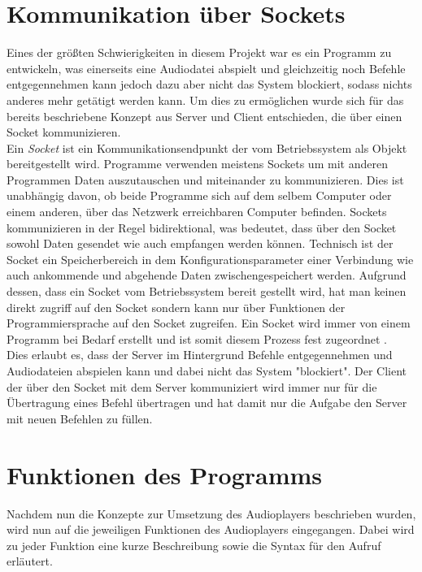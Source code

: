 \section{Kommunikation über Sockets}
Eines der größten Schwierigkeiten in diesem Projekt war es ein Programm zu entwickeln, was einerseits eine Audiodatei abspielt und gleichzeitig noch Befehle entgegennehmen kann jedoch dazu aber nicht das System blockiert, sodass nichts anderes mehr getätigt werden kann. Um dies zu ermöglichen wurde sich für das bereits beschriebene Konzept aus Server und Client entschieden, die über einen Socket kommunizieren. \\
Ein \textit{Socket} ist ein Kommunikationsendpunkt der vom Betriebssystem als Objekt bereitgestellt wird. Programme verwenden meistens Sockets um mit anderen Programmen Daten auszutauschen und miteinander zu kommunizieren. Dies ist unabhängig davon, ob beide Programme sich auf dem selbem Computer oder einem anderen, über das Netzwerk erreichbaren Computer befinden. Sockets kommunizieren in der Regel bidirektional, was bedeutet, dass über den Socket sowohl Daten gesendet wie auch empfangen werden können. Technisch ist der Socket ein Speicherbereich in dem Konfigurationsparameter einer Verbindung wie auch ankommende und abgehende Daten zwischengespeichert werden. Aufgrund dessen, dass ein Socket vom Betriebssystem bereit gestellt wird, hat man keinen direkt zugriff auf den Socket sondern kann nur über Funktionen der Programmiersprache auf den Socket zugreifen.
Ein Socket wird immer von einem Programm bei Bedarf erstellt und ist somit diesem Prozess fest zugeordnet \autocite{pollakowski_2012}. \\
Dies erlaubt es, dass der Server im Hintergrund Befehle entgegennehmen und Audiodateien abspielen kann und dabei nicht das System "blockiert". Der Client der über den Socket mit dem Server kommuniziert wird immer nur für die Übertragung eines Befehl übertragen und hat damit nur die Aufgabe den Server mit neuen Befehlen zu füllen.

\section{Funktionen des Programms}
Nachdem nun die Konzepte zur Umsetzung des Audioplayers beschrieben wurden, wird nun auf die jeweiligen Funktionen des Audioplayers eingegangen. Dabei wird zu jeder Funktion eine 
kurze Beschreibung sowie die Syntax für den Aufruf erläutert.

